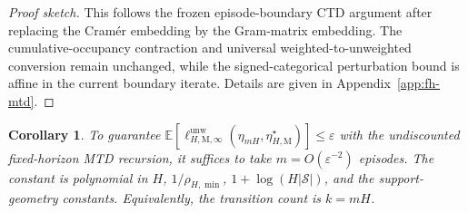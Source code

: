 \documentclass{article}
\newtheorem{corollary}[theorem]{Corollary}
\newcommand{\X}{\mathcal{S}}
\begin{document}
\begin{proof}[Proof sketch]
This follows the frozen episode-boundary CTD argument after replacing the Cram\'er embedding by the Gram-matrix embedding. The cumulative-occupancy contraction and universal weighted-to-unweighted conversion remain unchanged, while the signed-categorical perturbation bound is affine in the current boundary iterate. Details are given in Appendix~\ref{app:fh-mtd}.
\end{proof}

\begin{corollary}\label{cor:undisc-mtd}
To guarantee $\mathbb{E}[\ell_{H, \mathrm M,\infty}^{\mathrm{unw}}(\eta_{mH},\eta_{H, \mathrm M}^\star)] \le \varepsilon$ with the undiscounted fixed-horizon MTD recursion, it suffices to take $m = O(\varepsilon^{-2})$ episodes. The constant is polynomial in $H$, $1/\rho_{H,\min}$, $1+\log(H\lvert\X\rvert)$, and the support-geometry constants. Equivalently, the transition count is $k=mH$.
\end{corollary}
\end{document}
